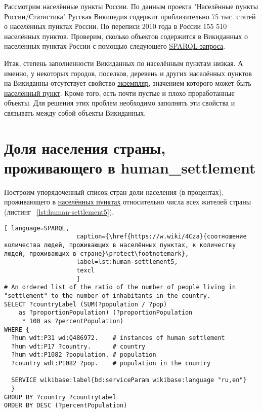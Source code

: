 Рассмотрим населённые пункты России. По данным проекта "Населённые пункты России/Статистика" Русская Википедия содержит приблизительно 75 тыс. статей о населённых пунктах России. По переписи 2010 года в России 155 510 населённых пунктов. Проверим, сколько объектов содержится в Викиданных о населённых пунктах России с помощью следующего \href{https://w.wiki/4FVE}{SPARQL-запроса}\protect\footnotemark. 


Итак, степень заполненности Викиданных по населённым пунктам низкая. А именно, у некоторых городов, поселков, деревень и других населённых пунктов на Викиданны отсутствует свойство \href{http://www.wikidata.org/entity/Q21503252}{экземпляр}, значением которого может быть \href{http://www.wikidata.org/entity/Q486972}{населённый пункт}. Кроме того, есть почти пустые и плохо проработанные объекты. Для решения этих проблем необходимо заполнять эти свойства и связывать между собой объекты Викиданных.

\section{Доля населения страны, проживающего в human\_settlement}

Построим упорядоченный список стран доли населения (в процентах), проживающего в \href{http://www.wikidata.org/entity/Q486972}{населённых пунктах} относительно числа всех жителей страны (листинг ~\protect\ref{lst:human-settlement5}).

\begin{lstlisting}[ language=SPARQL, 
                    caption={\href{https://w.wiki/4Cza}{соотношение количества людей, проживающих в населённых пунктах, к количеству людей, проживающих в стране}\protect\footnotemark},
                    label=lst:human-settlement5,
                    texcl 
                    ]
# An ordered list of the ratio of the number of people living in 
"settlement" to the number of inhabitants in the country.
SELECT ?countryLabel (SUM(?population / ?pop) 
	as ?proportionPopulation) (?proportionPopulation
	 * 100 as ?percentPopulation)
WHERE {
  ?hum wdt:P31 wd:Q486972.    # instances of human settlement  
  ?hum wdt:P17 ?country.      # country 
  ?hum wdt:P1082 ?population. # population
  ?country wdt:P1082 ?pop.    # population in the country

  SERVICE wikibase:label{bd:serviceParam wikibase:language "ru,en"}
  }
GROUP BY ?country ?countryLabel
ORDER BY DESC (?percentPopulation)
\end{lstlisting}%

